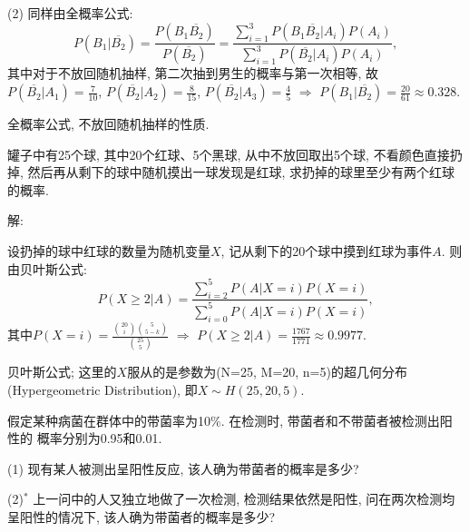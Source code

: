 \documentclass[standard]{ExBook}
\begin{document}
\begin{qitems}
\begin{bbox}
(2) 同样由全概率公式:
$$P(B_{1}|\overline{B_{2}})=\frac{P(B_{1}\overline{B_{2}})}{P(\overline{B_{2}})}=\frac{\sum\limits_{i=1}^{3}P(B_{1}\overline{B_{2}}|A_{i})P(A_{i})}{\sum\limits_{i=1}^{3}P(\overline{B_{2}}|A_{i})P(A_{i})},$$
其中对于不放回随机抽样, 第二次抽到男生的概率与第一次相等, 故$P(\overline{B_{2}}|A_{1})=\frac{7}{10}$, $P(\overline{B_{2}}|A_{2})=\frac{8}{15}$, $P(\overline{B_{2}}|A_{3})=\frac{4}{5}$ $\Longrightarrow$ $P(B_{1}|\overline{B_{2}})=\frac{20}{61}\approx0.328$.

\textcolor{themeColor}{\selectfont {} 全概率公式, 不放回随机抽样的性质.}
    \end{bbox}

\vspace{-5em}

    \begin{bbox}
    \begin{shaded}
        \qitem
罐子中有25个球, 其中20个红球、5个黑球, 从中不放回取出5个球, 不看颜色直接扔掉, 然后再从剩下的球中随机摸出一球发现是红球, 求扔掉的球里至少有两个红球的概率.
    \end{shaded}
    \end{bbox}

\vspace{-5em}

    \begin{bbox}
解: 

设扔掉的球中红球的数量为随机变量$X$, 记从剩下的20个球中摸到红球为事件$A$. 则由贝叶斯公式:
$$P(X\geq2|A)=\frac{\sum\limits_{i=2}^{5}P(A|X=i)P(X=i)}{\sum\limits_{i=0}^{5}P(A|X=i)P(X=i)},$$
其中$P(X=i)=\displaystyle\frac{\binom{20}{i}\binom{5}{5-k}}{\binom{25}{5}}$ $\Rightarrow$ $P(X\geq2|A)=\frac{1767}{1771}\approx0.9977.$

\textcolor{themeColor}{\selectfont {} 贝叶斯公式; 这里的$X$服从的是参数为(N=25, M=20, n=5)的超几何分布(Hypergeometric Distribution), 即$X\sim H(25,20,5)$.}
    \end{bbox}

\vspace{-5em}

    \begin{bbox}
    \begin{shaded}
        \qitem
假定某种病菌在群体中的带菌率为10\%. 在检测时, 带菌者和不带菌者被检测出阳性的
概率分别为0.95和0.01.

(1) 现有某人被测出呈阳性反应, 该人确为带菌者的概率是多少?

(2)$^*$  上一问中的人又独立地做了一次检测, 检测结果依然是阳性, 问在两次检测均呈阳性的情况下, 该人确为带菌者的概率是多少?
    \end{shaded}
    \end{bbox}


\end{qitems}
\end{document}
